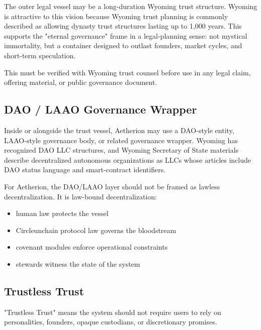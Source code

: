 ﻿\documentclass[12pt]{article}
\begin{document}
The outer legal vessel may be a long-duration Wyoming trust structure. Wyoming is attractive to this vision because Wyoming trust planning is commonly described as allowing dynasty trust structures lasting up to 1,000 years. This supports the "eternal governance" frame in a legal-planning sense: not mystical immortality, but a container designed to outlast founders, market cycles, and short-term speculation.

This must be verified with Wyoming trust counsel before use in any legal claim, offering material, or public governance document.

\subsection{DAO / LAAO Governance Wrapper}


Inside or alongside the trust vessel, Aetherion may use a DAO-style entity, LAAO-style governance body, or related governance wrapper. Wyoming has recognized DAO LLC structures, and Wyoming Secretary of State materials describe decentralized autonomous organizations as LLCs whose articles include DAO status language and smart-contract identifiers.

For Aetherion, the DAO/LAAO layer should not be framed as lawless decentralization. It is law-bound decentralization:

\begin{itemize}
  \item human law protects the vessel
\end{itemize}
\begin{itemize}
  \item Circleunchain protocol law governs the bloodstream
\end{itemize}
\begin{itemize}
  \item covenant modules enforce operational constraints
\end{itemize}
\begin{itemize}
  \item stewards witness the state of the system
\end{itemize}

\subsection{Trustless Trust}


"Trustless Trust" means the system should not require users to rely on personalities, founders, opaque custodians, or discretionary promises.
\end{document}
